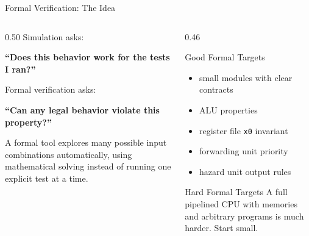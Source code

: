 \documentclass[aspectratio=169,10pt]{beamer}
\begin{document}
\begin{frame}{Formal Verification: The Idea}
  \begin{columns}[T]
    \begin{column}{0.50\textwidth}
      Simulation asks:
      \begin{center}
        \large\textbf{``Does this behavior work for the tests I ran?''}
      \end{center}

      Formal verification asks:
      \begin{center}
        \large\textbf{``Can any legal behavior violate this property?''}
      \end{center}

      \vspace{0.7em}
      A formal tool explores many possible input combinations automatically, using mathematical solving instead of running one explicit test at a time.
    \end{column}
    \begin{column}{0.46\textwidth}
      \begin{block}{Good Formal Targets}
        \begin{itemize}\small
          \item small modules with clear contracts
          \item ALU properties
          \item register file \texttt{x0} invariant
          \item forwarding unit priority
          \item hazard unit output rules
        \end{itemize}
      \end{block}

      \vspace{0.6em}
      \begin{alertblock}{Hard Formal Targets}
        A full pipelined CPU with memories and arbitrary programs is much harder. Start small.
      \end{alertblock}
    \end{column}
  \end{columns}
\end{frame}
\end{document}
